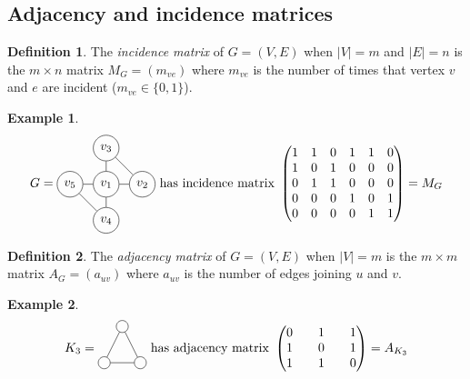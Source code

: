 \documentclass{article}
\theoremstyle{definition}
\newtheorem*{defn}{Definition}
\newtheorem*{ex}{Example}
\begin{document}
\subsection{Adjacency and incidence matrices}

\begin{defn}
The \emph{incidence matrix} of $G = (V,E)$ when $|V| = m$ and $|E| = n$ is the $m\times n$ matrix $M_G = (m_{ve})$ where $m_{ve}$ is the number of times that vertex $v$ and $e$ are incident ($m_{ve} \in \{0, 1\}$).
\end{defn}

\begin{ex}
$$G=
\begin{tikzpicture}[baseline=-0.5ex]
  \node[draw,circle] (G-1) at (0,0) {$v_1$};
  \node[draw,circle] (G-2) at (1,0) {$v_2$};
  \node[draw,circle] (G-3) at (0,1) {$v_3$};
  \node[draw,circle] (G-4) at (0,-1) {$v_4$};
  \node[draw,circle] (G-5) at (-1,0) {$v_5$};
  \draw (G-1) -- (G-2) -- (G-3) -- (G-1) -- (G-4) -- (G-5) -- (G-1);
\end{tikzpicture}
\text{ has incidence matrix }
\begin{pmatrix}
1 & 1 & 0 & 1 & 1 & 0 \\
1 & 0 & 1 & 0 & 0 & 0 \\
0 & 1 & 1 & 0 & 0 & 0 \\
0 & 0 & 0 & 1 & 0 & 1 \\
0 & 0 & 0 & 0 & 1 & 1
\end{pmatrix} = M_{G}$$
\end{ex}

\begin{defn}
The \emph{adjacency matrix} of $G = (V,E)$ when $|V| = m$ is the $m\times m$ matrix $A_G = (a_{uv})$ where $a_{uv}$ is the number of edges joining $u$ and $v$.
\end{defn}

\begin{ex}
$$K_3 = 
\begin{tikzpicture}[baseline=2ex]
  \node[draw,circle] (G-1) at (-0.5,0) {};
  \node[draw,circle] (G-2) at (0.5,0) {};
  \node[draw,circle] (G-3) at (0,1) {};
  \draw (G-1) -- (G-2) -- (G-3) -- (G-1);
\end{tikzpicture}
\text{ has adjacency matrix }
\begin{pmatrix}
0 && 1 && 1 \\
1 && 0 && 1 \\
1 && 1 && 0 
\end{pmatrix} = A_{K_{3}}$$
\end{ex}
\end{document}
